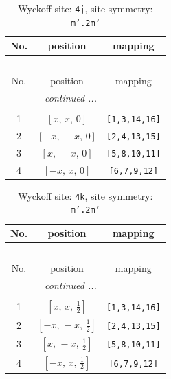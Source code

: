 \documentclass[fleqn,8pt]{jsarticle}
\begin{document}
\begin{longtable}{ccc}
\caption{Wyckoff site: {\tt 4j}, site symmetry: {\tt m'.2m'}}
 \\
 \hline \hline
No. & position & mapping \\ \hline \endfirsthead

\multicolumn{2}{l}{\tablename\ \thetable{}} \\
 \hline \hline
No. & position & mapping \\ \hline \endhead

 \hline \hline
\multicolumn{2}{r}{\footnotesize\it continued ...} \\ \endfoot

 \hline \hline
\multicolumn{2}{r}{} \\ \endlastfoot

1 & $\left[ x,\, x,\, 0 \right]$ & {\tt [1,3,14,16]} \\ \hline
2 & $\left[ - x,\, - x,\, 0 \right]$ & {\tt [2,4,13,15]} \\ \hline
3 & $\left[ x,\, - x,\, 0 \right]$ & {\tt [5,8,10,11]} \\ \hline
4 & $\left[ - x,\, x,\, 0 \right]$ & {\tt [6,7,9,12]} \\
\end{longtable}
\renewcommand{\arraystretch}{1.2}
\begin{longtable}{ccc}
\caption{Wyckoff site: {\tt 4k}, site symmetry: {\tt m'.2m'}}
 \\
 \hline \hline
No. & position & mapping \\ \hline \endfirsthead

\multicolumn{2}{l}{\tablename\ \thetable{}} \\
 \hline \hline
No. & position & mapping \\ \hline \endhead

 \hline \hline
\multicolumn{2}{r}{\footnotesize\it continued ...} \\ \endfoot

 \hline \hline
\multicolumn{2}{r}{} \\ \endlastfoot

1 & $\left[ x,\, x,\, \frac{1}{2} \right]$ & {\tt [1,3,14,16]} \\ \hline
2 & $\left[ - x,\, - x,\, \frac{1}{2} \right]$ & {\tt [2,4,13,15]} \\ \hline
3 & $\left[ x,\, - x,\, \frac{1}{2} \right]$ & {\tt [5,8,10,11]} \\ \hline
4 & $\left[ - x,\, x,\, \frac{1}{2} \right]$ & {\tt [6,7,9,12]} \\
\end{longtable}
\end{document}
